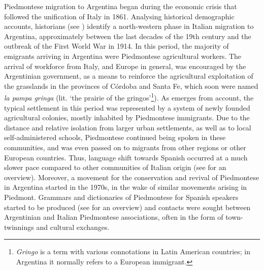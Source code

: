 \documentclass[output=paper]{langscibook}
\begin{document}
Piedmontese migration to Argentina began during the economic crisis that followed the unification of Italy in 1861. Analysing historical demographic accounts, historians (see \citealt{Nascimbene1987}) identify a north-western phase in Italian migration to Argentina, approximately between the last decades of the 19th century and the outbreak of the First World War in 1914. In this period, the majority of emigrants arriving in Argentina were Piedmontese agricultural workers. The arrival of workforce from Italy, and Europe in general, was encouraged by the Argentinian government, as a means to reinforce the agricultural exploitation of the grasslands in the provinces of Córdoba and Santa Fe, which soon were named \textit{la pampa gringa} (lit. ‘the prairie of the gringos’\footnote{\textit{Gringo} is a term with various connotations in Latin American countries; in Argentina it normally refers to a European immigrant.}). As emerges from  account, the typical settlement in this period was represented by a system of newly founded agricultural colonies, mostly inhabited by Piedmontese immigrants. Due to the distance and relative isolation from larger urban settlements, as well as to local self-administered schools, Piedmontese continued being spoken in these communities, and was even passed on to migrants from other regions or other European countries. Thus, language shift towards Spanish occurred at a much slower pace compared to other communities of Italian origin (see \citealt{Turchetta2005} for an overview). Moreover, a movement for the conservation and revival of Piedmontese in Argentina started in the 1970s, in the wake of similar movements arising in Piedmont. Grammars and dictionaries of Piedmontese for Spanish speakers started to be produced (see \citealt{Goria2015} for an overview) and contacts were sought between Argentinian and Italian Piedmontese associations, often in the form of town-twinnings and cultural exchanges.
\end{document}
